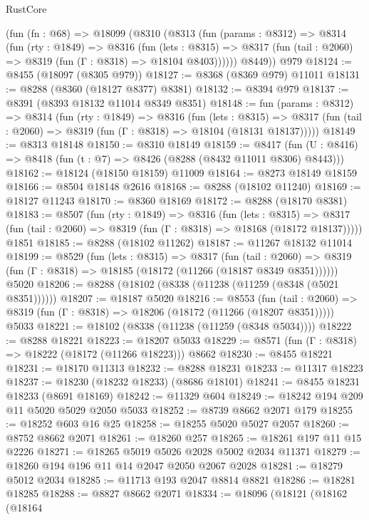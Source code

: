 \begin{lexlean}{RustCore}
\begin{coremodule}
    (fun (fn : @68) =>
    @18099
      (@8310
        (@8313
          (fun (params : @8312) =>
          @8314
            (fun (rty : @1849) =>
            @8316
              (fun (lets : @8315) =>
              @8317 (fun (tail : @2060) => @8319 (fun (Γ : @8318) => @18104 @8403))))))
        @8449))
    @979
@18124 := @8455 (@18097 (@8305 @979))
@18127 := @8368 (@8369 @979) @11011
@18131 := @8288 (@8360 (@18127 @8377) @8381)
@18132 := @8394 @979
@18137 := @8391 (@8393 @18132 @11014 @8349 @8351)
@18148 := fun (params : @8312) =>
  @8314
    (fun (rty : @1849) =>
    @8316
      (fun (lets : @8315) =>
      @8317 (fun (tail : @2060) => @8319 (fun (Γ : @8318) => @18104 (@18131 @18137)))))
@18149 := @8313 @18148
@18150 := @8310 @18149
@18159 := @8417
    (fun (U : @8416) => @8418 (fun (t : @7) => @8426 (@8288 (@8432 @11011 @8306) @8443)))
@18162 := @18124 (@18150 @18159) @11009
@18164 := @8273 @18149 @18159
@18166 := @8504 @18148 @2616
@18168 := @8288 (@18102 @11240)
@18169 := @18127 @11243
@18170 := @8360 @18169
@18172 := @8288 (@18170 @8381)
@18183 := @8507
    (fun (rty : @1849) =>
    @8316
      (fun (lets : @8315) =>
      @8317 (fun (tail : @2060) => @8319 (fun (Γ : @8318) => @18168 (@18172 @18137)))))
    @1851
@18185 := @8288 (@18102 @11262)
@18187 := @11267 @18132 @11014
@18199 := @8529
    (fun (lets : @8315) =>
    @8317
      (fun (tail : @2060) =>
      @8319 (fun (Γ : @8318) => @18185 (@18172 (@11266 (@18187 @8349 @8351))))))
    @5020
@18206 := @8288 (@18102 (@8338 (@11238 (@11259 (@8348 (@5021 @8351))))))
@18207 := @18187 @5020
@18216 := @8553
    (fun (tail : @2060) => @8319 (fun (Γ : @8318) => @18206 (@18172 (@11266 (@18207 @8351)))))
    @5033
@18221 := @18102 (@8338 (@11238 (@11259 (@8348 @5034))))
@18222 := @8288 @18221
@18223 := @18207 @5033
@18229 := @8571 (fun (Γ : @8318) => @18222 (@18172 (@11266 @18223))) @8662
@18230 := @8455 @18221
@18231 := @18170 @11313
@18232 := @8288 @18231
@18233 := @11317 @18223
@18237 := @18230 (@18232 @18233) (@8686 @18101)
@18241 := @8455 @18231 @18233 (@8691 @18169)
@18242 := @11329 @604
@18249 := @18242 @194 @209 @11 @5020 @5029 @2050 @5033
@18252 := @8739 @8662 @2071 @179
@18255 := @18252 @603 @16 @25
@18258 := @18255 @5020 @5027 @2057
@18260 := @8752 @8662 @2071
@18261 := @18260 @257
@18265 := @18261 @197 @11 @15 @2226
@18271 := @18265 @5019 @5026 @2028 @5002 @2034 @11371
@18279 := @18260 @194 @196 @11 @14 @2047 @2050 @2067 @2028
@18281 := @18279 @5012 @2034
@18285 := @11713 @193 @2047 @8814 @8821
@18286 := @18281 @18285
@18288 := @8827 @8662 @2071
@18334 := @18096
    (@18121
      (@18162
        (@18164

\end{coremodule}
\end{lexlean}
